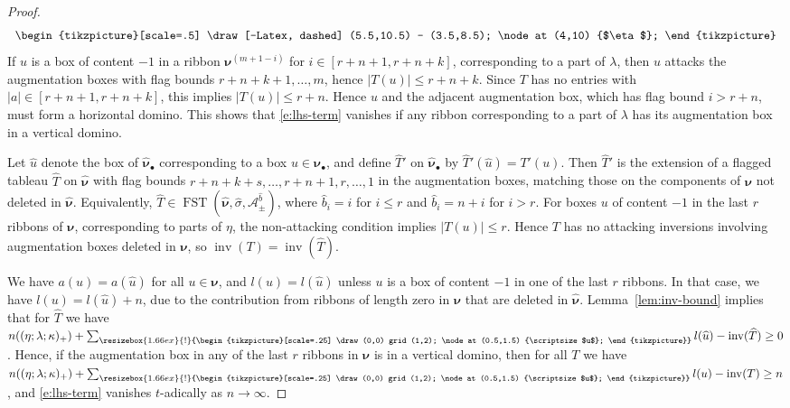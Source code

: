 \documentclass[12pt]{amsart}
\theoremstyle{definition}
\theoremstyle{remark}
\newcommand{\nubold}{{\boldsymbol \nu }}
\newcommand{\Acal}{{\mathcal A}}
\newcommand{\That}{\widehat{T}}
\newcommand{\bhat}{\widehat{b}}
\newcommand{\uhat}{\widehat{u}}
\newcommand{\sigmahat}{\widehat{\sigma }}
\newcommand{\nuboldhat}{\widehat{\nubold }}
\newcommand{\baug}{\bullet }
\newcommand{\domino}{\begin{tikzpicture}[scale=.25]
\draw (0,0) grid (1,2);
\node at (0.5,1.5) {\scriptsize $u$};
\end{tikzpicture}}
\newcommand{\smalldomino}{\resizebox{1.66ex}{!}{\domino}}
\DeclareMathOperator{\inv}{inv}
\DeclareMathOperator{\FSST}{FST}
\begin{document}
\begin{proof}
\begin{equation}
\begin{array}{c}
\begin{tikzpicture}[scale=.5]
\draw[-Latex, dashed]  (5.5,10.5) -- (3.5,8.5);
\node  at (4,10) {$\eta $};
\end{tikzpicture}
\end{array}
\end{equation}
If $u$ is a box of content $-1$ in a ribbon $\nubold ^{(m+1-i)}$ for
$i\in [r+n+1, r+n+k]$, corresponding to a part of $\lambda $, then $u$
attacks the augmentation boxes with flag bounds $r+n+k+1,\ldots,m$,
hence $|T(u)|\leq r+n+k$.  Since $T$ has no entries with $|a|\in
[r+n+1, r+n+k]$, this implies $|T(u)|\leq r+n$.  Hence $u$ and the
adjacent augmentation box, which has flag bound $i>r+n$, must form a
horizontal domino.  This shows that \eqref{e:lhs-term} vanishes if any
ribbon corresponding to a part of $\lambda $ has its augmentation box
in a vertical domino.

Let $\uhat $ denote the box of $\nuboldhat _{\baug }$ corresponding to
a box $u\in \nubold _{\baug }$, and define $\That '$ on $\nuboldhat
_{\baug }$ by $\That '(\uhat ) = T'(u)$.  Then $\That '$ is the
extension of a flagged tableau $\That $ on $\nuboldhat $ with flag
bounds $r+n+k+s,\ldots, r+n+1, r,\ldots,1$ in the augmentation boxes,
matching those on the components of $\nubold $ not deleted in
$\nuboldhat $.  Equivalently, $\That \in \FSST (\nuboldhat ,\sigmahat
,\Acal _{\pm }^{\bhat })$, where $\bhat _{i} = i$ for $i\leq r$
and $\bhat _{i} = n+i$ for $i>r$.  For boxes
$u$ of content $-1$ in the last $r$ ribbons of $\nubold $,
corresponding to parts of $\eta $, the non-attacking condition implies
$|T(u)|\leq r$.  Hence $T$ has no attacking inversions involving
augmentation boxes deleted in $\nubold$, so $\inv (T) = \inv (\That
)$.

We have $a(u) = a(\uhat )$ for all $u\in \nubold $, and $l(u) =
l(\uhat )$ unless $u$ is a box of content $-1$ in one of the last $r$
ribbons.  In that case, we have $l(u) = l(\uhat )+n$, due to the
contribution from ribbons of length zero in $\nubold $ that are
deleted in $\nuboldhat $.  Lemma~\ref{lem:inv-bound} implies that for
$\That $ we have $n((\eta ; \lambda; \kappa ) _{+}) + \sum
_{\smalldomino } l(\uhat ) - \inv (\That )\geq 0$.  Hence, if the
augmentation box in any of the last $r$ ribbons in $\nubold $ is in a
vertical domino, then for all $T$ we have $n((\eta ; \lambda; \kappa )
_{+}) + \sum _{\smalldomino } l(u) - \inv (T)\geq n$, and
\eqref{e:lhs-term} vanishes $t$-adically as $n\rightarrow \infty $.


\end{proof}
\end{document}
